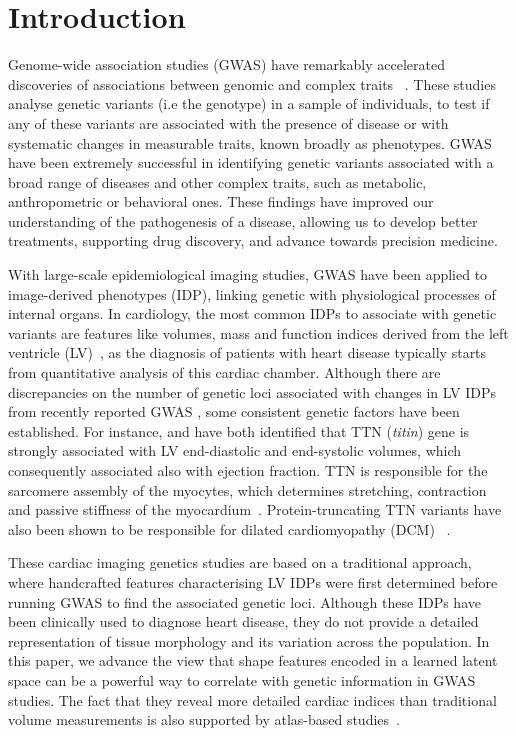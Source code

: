 \section*{Introduction}
Genome-wide association studies (GWAS) have remarkably accelerated discoveries of associations between genomic and complex traits ~\cite{ref_gwas_review}. These studies analyse genetic variants (i.e the genotype) in a sample of individuals, to test if any of these variants are associated with the presence of disease or with systematic changes in measurable traits, known broadly as phenotypes. GWAS have been extremely successful in identifying genetic variants associated with a broad range of diseases and other complex traits, such as metabolic, anthropometric or behavioral ones. These findings have improved our understanding of the pathogenesis of a disease, allowing us to develop better treatments, supporting drug discovery, and advance towards precision medicine.

With large-scale epidemiological imaging studies, GWAS have been applied to image-derived phenotypes (IDP), linking genetic with physiological processes of internal organs. In cardiology, the most common IDPs to associate with genetic variants are features like volumes, mass and function indices derived from the left ventricle (LV)~\cite{ref_nayaung, ref_biffi}, as the diagnosis of patients with heart disease typically starts from quantitative analysis of this cardiac chamber. Although there are discrepancies on the number of genetic loci associated with changes in LV IDPs from recently reported GWAS \cite{ref_nayaung, ref_pirruccello, ref_biffi}, some consistent genetic factors have been established. 
For instance, \cite{ref_nayaung} and \cite{ref_pirruccello} have both identified that TTN ({\em titin}) gene is strongly associated with LV end-diastolic and end-systolic volumes, which consequently associated also with ejection fraction. TTN is responsible for the sarcomere assembly of the myocytes, which determines stretching, contraction and passive stiffness of the myocardium~\cite{granzier_giant_2004}. Protein-truncating TTN variants have also been shown to be responsible for dilated cardiomyopathy (DCM) ~\cite{tayal_phenotype_2017}.

These cardiac imaging genetics studies are based on a traditional approach, where handcrafted features characterising LV IDPs were first determined before running GWAS to find the associated genetic loci. Although these IDPs have been clinically used to diagnose heart disease, they do not provide a detailed representation of tissue morphology and its variation across the population. In this paper, we advance the view that shape features encoded in a learned latent space can be a powerful way to correlate with genetic information in GWAS studies. The fact that they reveal more detailed cardiac indices than traditional volume measurements is also supported by atlas-based studies~\cite{gilbert_independent_2019, medrano-gracia_left_2014}.

